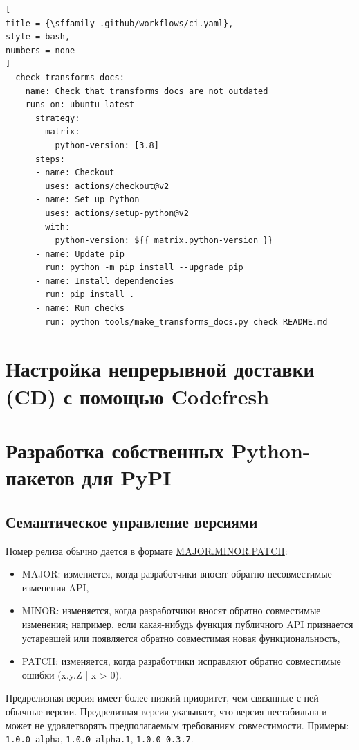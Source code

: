 \documentclass[%
	11pt,
	a4paper,
	utf8,
		]{article}
\begin{document}
\begin{lstlisting}[
title = {\sffamily .github/workflows/ci.yaml},
style = bash,
numbers = none	
]
  check_transforms_docs:
    name: Check that transforms docs are not outdated
    runs-on: ubuntu-latest
      strategy:
        matrix:
          python-version: [3.8]
      steps:
      - name: Checkout
        uses: actions/checkout@v2
      - name: Set up Python
        uses: actions/setup-python@v2
        with:
          python-version: ${{ matrix.python-version }}
      - name: Update pip
        run: python -m pip install --upgrade pip
      - name: Install dependencies
        run: pip install .
      - name: Run checks
        run: python tools/make_transforms_docs.py check README.md
\end{lstlisting}


\section{Настройка непрерывной доставки (CD) с помощью Codefresh}

\section{Разработка собственных Python-пакетов для PyPI}

\subsection{Семантическое управление версиями}

Номер релиза обычно дается в формате \href{https://semver.org/}{MAJOR.MINOR.PATCH}:
\begin{itemize}
	\item MAJOR: изменяется, когда разработчики вносят обратно несовместимые изменения API,
	
	\item MINOR: изменяется, когда разработчики вносят обратно совместимые изменения; например, если какая-нибудь функция публичного API признается устаревшей или появляется обратно совместимая новая функциональность,
	
	\item PATCH: изменяется, когда разработчики исправляют обратно совместимые ошибки (x.y.Z | x > 0).
\end{itemize}

Предрелизная версия имеет более низкий приоритет, чем связанные с ней обычные версии. Предрелизная версия указывает, что версия нестабильна и может не удовлетворять предполагаемым требованиям совместимости. Примеры: \texttt{1.0.0-alpha}, \texttt{1.0.0-alpha.1}, \texttt{1.0.0-0.3.7}.
\end{document}
